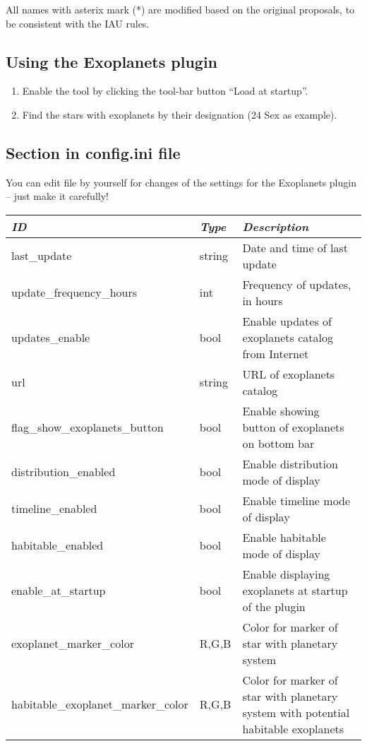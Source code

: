 All names with asterix mark (*) are modified based on the original proposals, to be consistent with the IAU rules.

\subsection{Using the Exoplanets plugin}
\label{sec:plugins:Exoplanets:using}

\begin{enumerate}
\item Enable the tool by clicking the tool-bar button ``Load at startup''.
\item Find the stars with exoplanets by their designation (24 Sex as example).
\end{enumerate}

\subsection{Section  in config.ini file}
\label{sec:plugins:Exoplanets:config}

You can edit  file by yourself for changes of the
settings for the Exoplanets plugin -- just make it carefully!

\begin{longtabu} to \textwidth {l|l|X}\toprule
\emph{ID}            & \emph{Type} & \emph{Description}\\\midrule
last\_update  & string & Date and time of last update \\\midrule
update\_frequency\_hours  & int & Frequency of updates, in hours \\\midrule
updates\_enable  & bool & Enable updates of exoplanets catalog from Internet \\\midrule
url  & string & URL of exoplanets catalog \\\midrule
flag\_show\_exoplanets\_button  & bool & Enable showing button of exoplanets on bottom bar \\\midrule
distribution\_enabled  & bool & Enable distribution mode of display \\\midrule
timeline\_enabled  & bool & Enable timeline mode of display \\\midrule
habitable\_enabled  & bool & Enable habitable mode of display \\\midrule
enable\_at\_startup  & bool & Enable displaying exoplanets at startup of the plugin \\\midrule
exoplanet\_marker\_color & R,G,B & Color for marker of star with planetary system \\\midrule
habitable\_exoplanet\_marker\_color  & R,G,B & Color for marker of star with planetary system with potential habitable exoplanets
 \\\bottomrule
\end{longtabu}

